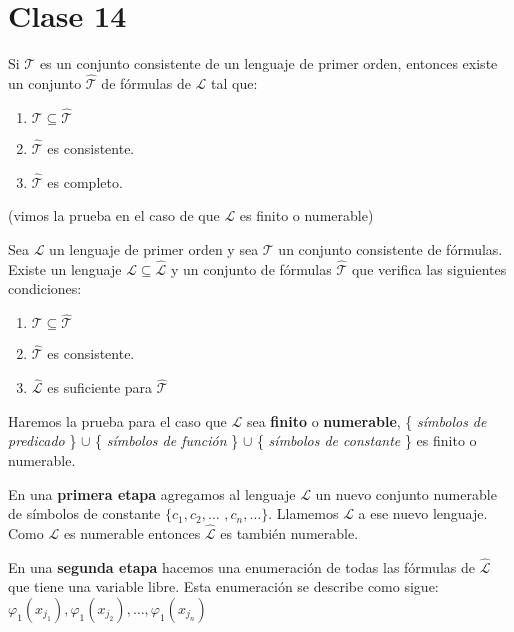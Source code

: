\section{Clase 14}
 
Si $\mathcal{T}$ es un conjunto consistente de un lenguaje de primer orden, entonces existe un conjunto $\hat{\mathcal{T}}$ de f\'ormulas de $\mathcal{L}$ tal que:
 
\begin{enumerate}
	\item $\mathcal{T} \subseteq \hat{\mathcal{T}}$
	\item $\hat{\mathcal{T}}$ es consistente.
	\item $\hat{\mathcal{T}}$ es completo.
\end{enumerate}
 
(vimos la prueba en el caso de que $\mathcal{L}$ es finito o numerable)
 
\begin{theorem}
Sea $\mathcal{L}$ un lenguaje de primer orden y sea $\mathcal{T}$ un conjunto consistente de f\'ormulas. Existe un lenguaje $\mathcal{L} \subseteq \hat{\mathcal{L}}$ y un conjunto de f\'ormulas $\hat{\mathcal{T}}$ que verifica las siguientes condiciones:
 
\begin{enumerate}
	\item $\mathcal{T} \subseteq \hat{\mathcal{T}}$
	\item $\hat{\mathcal{T}}$ es consistente.
	\item $\hat{\mathcal{L}}$ es suficiente para $\hat{\mathcal{T}}$
\end{enumerate}
\end{theorem}
 
Haremos la prueba para el caso que $\mathcal{L}$ sea \textbf{finito} o \textbf{numerable}, \{ \textit{s\'imbolos de predicado} \} $\cup$ \{ \textit{s\'imbolos de funci\'on} \} $\cup$ \{ \textit{s\'imbolos de constante} \} es finito o numerable.
 
En una \textbf{primera etapa} agregamos al lenguaje $\mathcal{L}$ un nuevo conjunto numerable de s\'imbolos de constante $\{ c_1, c_2, \ldots$ $, c_n, \ldots \}$. Llamemos $\mathcal{L}$ a ese nuevo lenguaje. Como $\mathcal{L}$ es numerable entonces $\hat{\mathcal{L}}$ es tambi\'en numerable.
 
En una \textbf{segunda etapa} hacemos una enumeraci\'on de todas las f\'ormulas de $\hat{\mathcal{L}}$ que tiene una variable libre. Esta enumeraci\'on se describe como sigue: 
$\varphi_{1}(x_{j_{1}}), \varphi_{1}(x_{j_{2}}), \ldots, \varphi_{1}(x_{j_{n}})$
 
